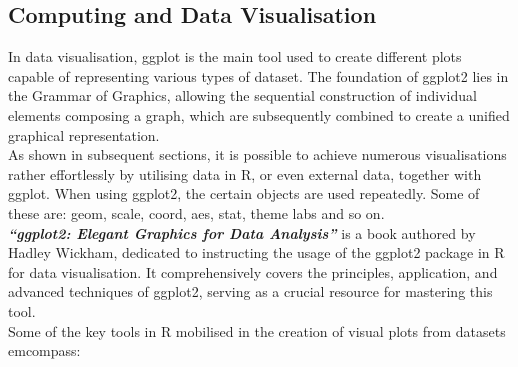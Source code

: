 \documentclass{article}\usepackage[]{graphicx}\usepackage[]{xcolor}
\begin{document}
\subsection{Computing and Data Visualisation}

In data visualisation, ggplot is the main tool used to create different plots capable of representing various types of dataset. The foundation of ggplot2 lies in the Grammar of Graphics, allowing the sequential construction of individual elements composing a graph, which are subsequently combined to create a unified graphical representation.\\

\noindent
As shown in subsequent sections, it is possible to achieve numerous visualisations rather effortlessly by utilising data in R, or even external data, together with ggplot.
When using ggplot2, the certain objects are used repeatedly. Some of these are: geom, scale, coord, aes, stat, theme labs and so on.\\

\noindent \textbf{\textit{``ggplot2: Elegant Graphics for Data Analysis''}} is a book authored by Hadley Wickham, dedicated to instructing the usage of the ggplot2 package in R for data visualisation. It comprehensively covers the principles, application, and advanced techniques of ggplot2, serving as a crucial resource for mastering this tool.\\

\noindent Some of the key tools in R mobilised in the creation of visual plots from datasets emcompass:
\end{document}
